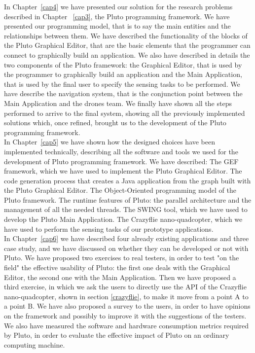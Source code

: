 In Chapter~\ref{cap4} we have presented our solution for the research problems described in Chapter ~\ref{cap3}, the Pluto programming framework.
We have presented our programming model, that is to say the main entities and the relationships between them.
We have described the functionality of the blocks of the Pluto Graphical Editor, that are the basic elements that the programmer can connect to graphically build an application.
We also have described in details the two components of the Pluto framework:
the Graphical Editor, that is used by the programmer to graphically build an application and the Main Application, that is used by the final user to specify the sensing tasks to be performed.
We have describe the navigation system, that is the conjunction point between the Main Application and the drones team.
We finally have shown all the steps performed to arrive to the final system, showing all the previously implemented solutions which, once refined, brought us to the development of the Pluto programming framework.
\\

In Chapter~\ref{cap5} we have shown how the designed choices have been implemented technically, describing all the software and tools we used for the development of Pluto programming framework.
We have described:
The GEF framework, which we have used to implement the Pluto Graphical Editor.
The code generation process that creates a Java application from the graph built with the Pluto Graphical Editor.
The Object-Oriented programming model of the Pluto framework.
The runtime features of Pluto: the parallel architecture and the management of all the needed threads.
The SWING tool, which we have used to develop the Pluto Main Application.
The Crazyflie nano-quadcopter, which we have used to perform the sensing tasks of our prototype applications.
\\

In Chapter~\ref{cap6} we have described four already existing applications and three case study, and we have discussed on whether they can be developed or not with Pluto. 
We have proposed two exercises to real testers, in order to test "on the field" the effective usability of Pluto:
the first one deals with the Graphical Editor, the second one with the Main Application.
Then we have proposed a third exercise, in which we ask the users to directly use the API of the Crazyflie nano-quadcopter, shown in section \ref{crazyflie}, to make it move from a point A to a point B.
We have also proposed a survey to the users, in order to have opinions on the framework and possibly to improve it with the suggestions of the testers.
We also have measured the software and hardware consumption metrics required by Pluto, in order to evaluate the effective impact of Pluto on an ordinary computing machine.

